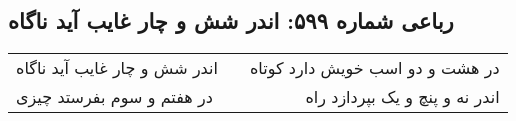 \begin{center}
\section*{رباعی شماره ۵۹۹: اندر شش و چار غایب آید ناگاه}
\label{sec:sh599}
\begin{longtable}{l p{0.5cm} r}
اندر شش و چار غایب آید ناگاه
&&
در هشت و دو اسب خویش دارد کوتاه
\\
در هفتم و سوم بفرستد چیزی
&&
اندر نه و پنچ و یک بپردازد راه
\\
\end{longtable}
\end{center}
